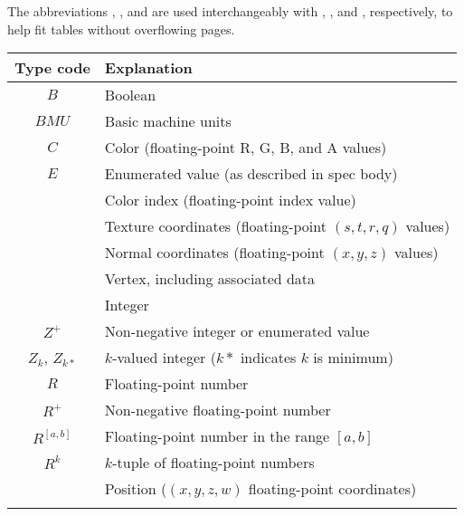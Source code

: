 The abbreviations , , and  are used
interchangeably with , , and ,
respectively, to help fit tables without overflowing pages.

\begin{table}   %
\begin{center}
\begin{tabular}{|c|p{3in}|}
\hline
Type code & Explanation \\ \hline \hline
$B$             & Boolean                                                   \\ \hline
$BMU$           & Basic machine units                                       \\ \hline
$C$             & Color (floating-point R, G, B, and A values)              \\ \hline
$E$             & Enumerated value (as described in spec body)              \\ \hline
\deprow{$CI$            & Color index (floating-point index value)                  \\ \hline}
\deprow{$T$             & Texture coordinates (floating-point $(s,t,r,q)$ values)   \\ \hline}
\deprow{$N$             & Normal coordinates (floating-point $(x,y,z)$ values)      \\ \hline}
\deprow{$V$             & Vertex, including associated data                         \\ \hline}
$Z$             & Integer                                                   \\ \hline
$Z^{+}$         & Non-negative integer or enumerated value                  \\ \hline
$Z_k$, $Z_{k*}$ & $k$-valued integer ($k*$ indicates $k$ is minimum)        \\ \hline
$R$             & Floating-point number                                     \\ \hline
$R^{+}$         & Non-negative floating-point number                        \\ \hline
$R^{[a,b]}$     & Floating-point number in the range $[a,b]$                \\ \hline
$R^k$           & $k$-tuple of floating-point numbers                       \\ \hline
\deprow{$P$             & Position ($(x,y,z,w)$ floating-point coordinates)         \\ \hline}

\end{tabular}
\end{center}
\end{table}
